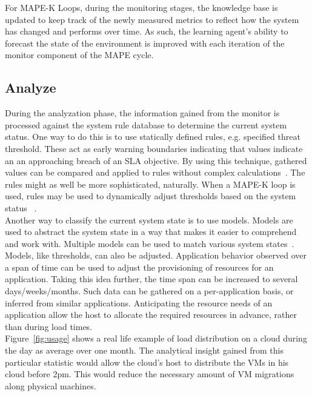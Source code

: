 \documentclass[a4paper]{llncs}
\begin{document}
For MAPE-K Loops, during the monitoring stages, the knowledge base is updated to keep track of the newly measured metrics to reflect how the system has changed and performs over time. As such, the learning agent’s ability to forecast the state of the environment is improved with each iteration of the monitor component of the MAPE cycle.

\subsection{Analyze}
During the analyzation phase, the information gained from the monitor is processed against the system rule database to determine the current system status. One way to do this is to use statically defined rules, e.g. specified threat threshold. These act as early warning boundaries indicating that values indicate an an approaching breach of an SLA objective. By using this technique, gathered values can be compared and applied to rules without complex calculations~\cite{Freitas10}. The rules might as well be more sophisticated, naturally.
When a MAPE-K loop is used, rules may be used to dynamically adjust thresholds based on the system status ~\cite{Emeakaroha10a}.\\

Another way to classify the current system state is to use models. Models are used to abstract the system state in a way that makes it easier to comprehend and work with. Multiple models can be used to match various system states~\cite{Shao10}.\\

Models, like thresholds, can also be adjusted. Application behavior observed over a span of time can be used to adjust the provisioning of resources for an application. Taking this idea further, the time span can be increased to several days/weeks/months. Such data can be gathered on a per-application basis, or inferred from similar applications. Anticipating the resource needs of an application allow the host to allocate the required resources in advance, rather than during load times.\\

Figure~\ref{fig:usage} shows a real life example of load distribution on a cloud during the day as average over one month. The analytical insight gained from this particular statistic would allow the cloud’s host to distribute the VMs in his cloud before 2pm. This would reduce the necessary amount of VM migrations along physical machines.\\
\end{document}

